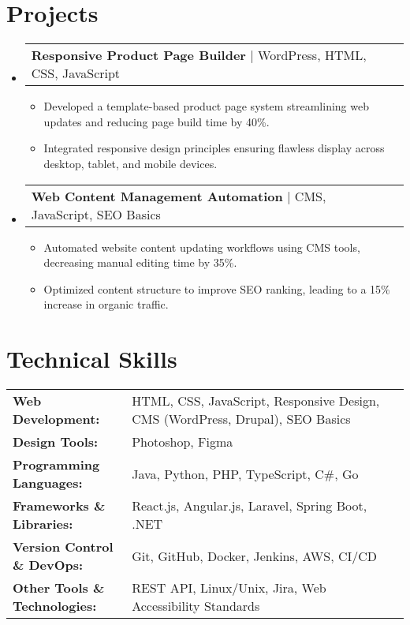 \documentclass[letterpaper,11pt]{article}
\makeatletter
\newcommand{\resumeItem}[1]{
  \item\footnotesize{
    {#1 \vspace{-2pt}}
  }
}
\newcommand{\resumeProjectHeading}[2]{
    \item
    \begin{tabular*}{1.001\textwidth}{l@{\extracolsep{\fill}}r}
      \small#1 & \textbf{\small #2}\\
    \end{tabular*}\vspace{-7pt}
}
\newcommand{\resumeSubHeadingListStart}{\begin{itemize}[leftmargin=0pt, label={}]}
\newcommand{\resumeSubHeadingListEnd}{\end{itemize}}
\newcommand{\resumeItemListStart}{\begin{itemize}[leftmargin=*]}
\newcommand{\resumeItemListEnd}{\end{itemize}\vspace{-5pt}}
\makeatother
\begin{document}
\section{Projects}
    \vspace{-5pt}
    \resumeSubHeadingListStart
      \resumeProjectHeading
          {\textbf{Responsive Product Page Builder} | WordPress, HTML, CSS, JavaScript}{}
          \resumeItemListStart
              \resumeItem{Developed a template-based product page system streamlining web updates and reducing page build time by 40\%.}
              \resumeItem{Integrated responsive design principles ensuring flawless display across desktop, tablet, and mobile devices.}
          \resumeItemListEnd
          \vspace{-16pt}
      \resumeProjectHeading
          {\textbf{Web Content Management Automation} | CMS, JavaScript, SEO Basics}{}
          \resumeItemListStart
              \resumeItem{Automated website content updating workflows using CMS tools, decreasing manual editing time by 35\%.}
              \resumeItem{Optimized content structure to improve SEO ranking, leading to a 15\% increase in organic traffic.}
          \resumeItemListEnd 
    \resumeSubHeadingListEnd
\vspace{-10pt}
\section{Technical Skills}
        \vspace{-14pt}
        \begin{table}[h]
            \footnotesize
            \begin{tabular}{p{0.3\linewidth} p{0.7\linewidth}}
                \textbf{Web Development:} & HTML, CSS, JavaScript, Responsive Design, CMS (WordPress, Drupal), SEO Basics \\
                \textbf{Design Tools:} & Photoshop, Figma \\
                \textbf{Programming Languages:} & Java, Python, PHP, TypeScript, C\#, Go \\
                \textbf{Frameworks \& Libraries:} & React.js, Angular.js, Laravel, Spring Boot, .NET \\
                \textbf{Version Control \& DevOps:} & Git, GitHub, Docker, Jenkins, AWS, CI/CD \\
                \textbf{Other Tools \& Technologies:} & REST API, Linux/Unix, Jira, Web Accessibility Standards \\
            \end{tabular}
        \end{table}
\end{document}
